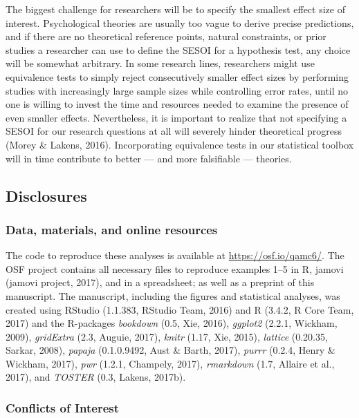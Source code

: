 \documentclass[english,floatsintext,man]{apa6}
\theoremstyle{definition}
\theoremstyle{definition}
\theoremstyle{definition}
\theoremstyle{remark}
\begin{document}
The biggest challenge for researchers will be to specify the smallest
effect size of interest. Psychological theories are usually too vague to
derive precise predictions, and if there are no theoretical reference
points, natural constraints, or prior studies a researcher can use to
define the SESOI for a hypothesis test, any choice will be somewhat
arbitrary. In some research lines, researchers might use equivalence
tests to simply reject consecutively smaller effect sizes by performing
studies with increasingly large sample sizes while controlling error
rates, until no one is willing to invest the time and resources needed
to examine the presence of even smaller effects. Nevertheless, it is
important to realize that not specifying a SESOI for our research
questions at all will severely hinder theoretical progress (Morey \&
Lakens, 2016). Incorporating equivalence tests in our statistical
toolbox will in time contribute to better --- and more falsifiable ---
theories.

\newpage

\subsection{Disclosures}\label{disclosures}

\subsubsection{Data, materials, and online
resources}\label{data-materials-and-online-resources}

The code to reproduce these analyses is available at
\url{https://osf.io/qamc6/}. The OSF project contains all necessary
files to reproduce examples 1--5 in R, jamovi (jamovi project, 2017),
and in a spreadsheet; as well as a preprint of this manuscript. The
manuscript, including the figures and statistical analyses, was created
using RStudio (1.1.383, RStudio Team, 2016) and R (3.4.2, R Core Team,
2017) and the R-packages \emph{bookdown} (0.5, Xie, 2016),
\emph{ggplot2} (2.2.1, Wickham, 2009), \emph{gridExtra} (2.3, Auguie,
2017), \emph{knitr} (1.17, Xie, 2015), \emph{lattice} (0.20.35, Sarkar,
2008), \emph{papaja} (0.1.0.9492, Aust \& Barth, 2017), \emph{purrr}
(0.2.4, Henry \& Wickham, 2017), \emph{pwr} (1.2.1, Champely, 2017),
\emph{rmarkdown} (1.7, Allaire et al., 2017), and \emph{TOSTER} (0.3,
Lakens, 2017b). \newline

\subsubsection{Conflicts of Interest}\label{conflicts-of-interest}
\end{document}
